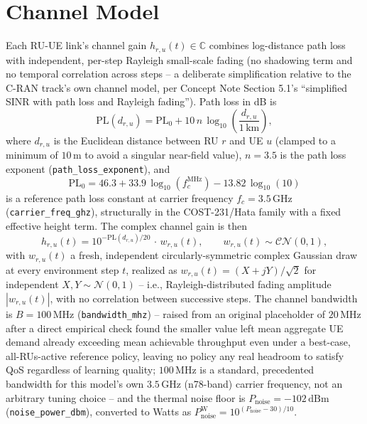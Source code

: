 \section{Channel Model}
\label{sec:oran-channel}

Each RU-UE link's channel gain $h_{r,u}(t) \in \mathbb{C}$ combines
log-distance path loss with independent, per-step Rayleigh small-scale
fading (no shadowing term and no temporal correlation across steps --
a deliberate simplification relative to the C-RAN track's own channel
model, per Concept Note Section 5.1's ``simplified SINR with path loss and
Rayleigh fading''). Path loss in dB is
\begin{equation}
  \mathrm{PL}(d_{r,u}) = \mathrm{PL}_0 + 10\,n\,\log_{10}\!\left(\frac{d_{r,u}}{1\,\mathrm{km}}\right),
  \label{eq:oran-pathloss}
\end{equation}
where $d_{r,u}$ is the Euclidean distance between RU $r$ and UE $u$
(clamped to a minimum of $10\,\mathrm{m}$ to avoid a singular near-field
value), $n=3.5$ is the path loss exponent
(\texttt{path\_loss\_exponent}), and
\begin{equation}
  \mathrm{PL}_0 = 46.3 + 33.9\,\log_{10}(f_c^{\mathrm{MHz}}) - 13.82\,\log_{10}(10)
  \label{eq:oran-pl0}
\end{equation}
is a reference path loss constant at carrier frequency $f_c=3.5\,\mathrm{GHz}$
(\texttt{carrier\_freq\_ghz}), structurally in the COST-231/Hata family with
a fixed effective height term. The complex channel gain is then
\begin{equation}
  h_{r,u}(t) = 10^{-\mathrm{PL}(d_{r,u})/20}\, \cdot\, w_{r,u}(t),
  \qquad w_{r,u}(t) \sim \mathcal{CN}(0, 1),
  \label{eq:oran-channel}
\end{equation}
with $w_{r,u}(t)$ a fresh, independent circularly-symmetric complex
Gaussian draw at every environment step $t$, realized as
$w_{r,u}(t) = (X + jY)/\sqrt{2}$ for independent
$X, Y \sim \mathcal{N}(0,1)$ -- i.e., Rayleigh-distributed fading amplitude
$|w_{r,u}(t)|$, with no correlation between successive steps. The channel
bandwidth is $B = 100\,\mathrm{MHz}$ (\texttt{bandwidth\_mhz}) -- raised
from an original placeholder of $20\,\mathrm{MHz}$ after a direct
empirical check found the smaller value left mean aggregate UE demand
already exceeding mean achievable throughput even under a best-case,
all-RUs-active reference policy, leaving no policy any real headroom to
satisfy QoS regardless of learning quality; $100\,\mathrm{MHz}$ is a
standard, precedented bandwidth for this model's own $3.5\,\mathrm{GHz}$
(n78-band) carrier frequency, not an arbitrary tuning choice -- and the
thermal noise floor is $P_{\mathrm{noise}} = -102\,\mathrm{dBm}$
(\texttt{noise\_power\_dbm}), converted to Watts as
$P_{\mathrm{noise}}^{\mathrm{W}} = 10^{(P_{\mathrm{noise}}-30)/10}$.

